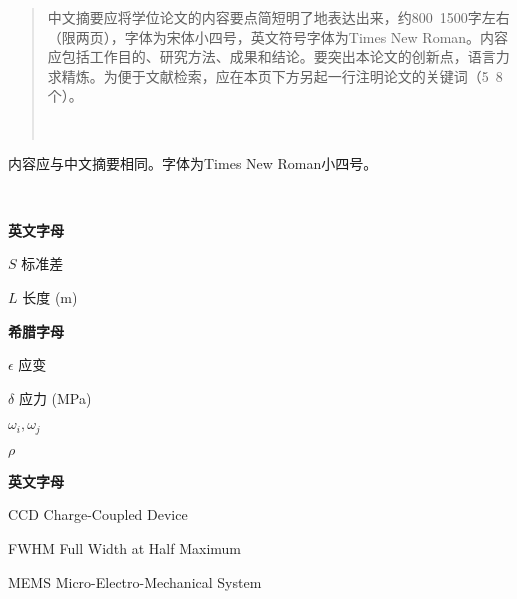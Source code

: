 \begin{abstract}
    \par\setlength\parindent{2em}
    中文摘要应将学位论文的内容要点简短明了地表达出来，约800~1500字左右（限两页），字体为宋体小四号，英文符号字体为Times New Roman。内容应包括工作目的、研究方法、成果和结论。要突出本论文的创新点，语言力求精炼。为便于文献检索，应在本页下方另起一行注明论文的关键词（5~8个）。

     \\
\end{abstract}

\begin{englishabstract}
    \par\setlength\parindent{2em}
    内容应与中文摘要相同。字体为Times New Roman小四号。

     \\

\end{englishabstract}


\XDUpremainmatter

\begin{symbollist}
    \item \hspace{14em} \textbf{英文字母}
    \item $S$\hspace{16em} {标准差}
    \item $L$\hspace{16em} {长度 (m)}
    \item 
    \item \hspace{14em} \textbf{希腊字母}
    \item $\epsilon$\hspace{16.3em} {应变}
    \item $\delta$\hspace{16.3em} {应力 (MPa)}
    \item $\omega_i, \omega_j$\hspace{14.7em}{频率 (Hz)}
    \item $\rho$\hspace{16.5em}{密度 (kg/m$^3$, 2.1节)}
    \item \hspace{17em}{电阻率($\Omega\cdot $m，3.1节)}
    \item
    \item \hspace{14em} \textbf{英文字母}
    \item CCD\hspace{15em} {Charge-Coupled Device}
    \item FWHM\hspace{14em} {Full Width at Half Maximum}
    \item MEMS\hspace{14em} {Micro-Electro-Mechanical System}
\end{symbollist}

